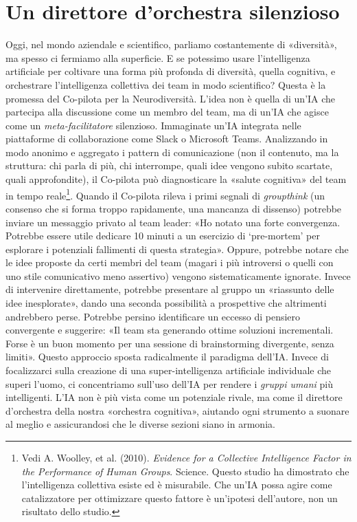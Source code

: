 \section{Un direttore d'orchestra silenzioso}
\label{sec:p4c34-un-direttore-d}
Oggi, nel mondo aziendale e scientifico, parliamo costantemente di «diversità», ma spesso ci fermiamo alla superficie. E se potessimo usare l'intelligenza artificiale per coltivare una forma più profonda di diversità, quella cognitiva, e orchestrare l'intelligenza collettiva dei team in modo scientifico? Questa è la promessa del Co-pilota per la Neurodiversità.
L'idea non è quella di un'IA che partecipa alla discussione come un membro del team, ma di un'IA che agisce come un \textit{meta-facilitatore} silenzioso. Immaginate un'IA integrata nelle piattaforme di collaborazione come Slack o Microsoft Teams. Analizzando in modo anonimo e aggregato i pattern di comunicazione (non il contenuto, ma la struttura: chi parla di più, chi interrompe, quali idee vengono subito scartate, quali approfondite), il Co-pilota può diagnosticare la «salute cognitiva» del team in tempo reale\footnote{Vedi A. Woolley, et al. (2010). \textit{Evidence for a Collective Intelligence Factor in the Performance of Human Groups}. Science. Questo studio ha dimostrato che l'intelligenza collettiva esiste ed è misurabile. Che un'IA possa agire come catalizzatore per ottimizzare questo fattore è un'ipotesi dell'autore, non un risultato dello studio.}.
Quando il Co-pilota rileva i primi segnali di \textit{groupthink} (un consenso che si forma troppo rapidamente, una mancanza di dissenso) potrebbe inviare un messaggio privato al team leader: «Ho notato una forte convergenza. Potrebbe essere utile dedicare 10 minuti a un esercizio di ‘pre-mortem’ per esplorare i potenziali fallimenti di questa strategia».
Oppure, potrebbe notare che le idee proposte da certi membri del team (magari i più introversi o quelli con uno stile comunicativo meno assertivo) vengono sistematicamente ignorate. Invece di intervenire direttamente, potrebbe presentare al gruppo un «riassunto delle idee inesplorate», dando una seconda possibilità a prospettive che altrimenti andrebbero perse. Potrebbe persino identificare un eccesso di pensiero convergente e suggerire: «Il team sta generando ottime soluzioni incrementali. Forse è un buon momento per una sessione di brainstorming divergente, senza limiti».
Questo approccio sposta radicalmente il paradigma dell'IA. Invece di focalizzarci sulla creazione di una super-intelligenza artificiale individuale che superi l'uomo, ci concentriamo sull'uso dell'IA per rendere i \textit{gruppi umani} più intelligenti. L'IA non è più vista come un potenziale rivale, ma come il direttore d'orchestra della nostra «orchestra cognitiva», aiutando ogni strumento a suonare al meglio e assicurandosi che le diverse sezioni siano in armonia.  
